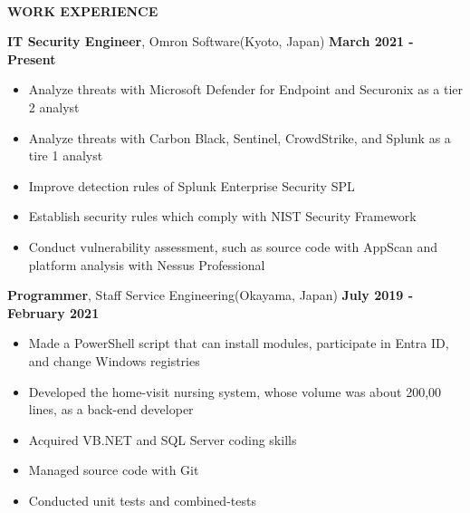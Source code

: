 \begin{center}
    \hrulefill \\
    \begin{large}
        \textbf{WORK EXPERIENCE} \\
    \end{large} 
\end{center}
\textbf{IT Security Engineer}, Omron Software(Kyoto, Japan) \hfill \textbf{March 2021 - Present}
\begin{itemize}
    \item Analyze threats with Microsoft Defender for Endpoint and Securonix as a tier 2 analyst
    \item Analyze threats with Carbon Black, Sentinel, CrowdStrike, and Splunk as a tire 1 analyst
    \item Improve detection rules of Splunk Enterprise Security SPL
    \item Establish security rules which comply with NIST Security Framework
    \item Conduct vulnerability assessment, such as source code with AppScan and platform analysis with Nessus Professional
\end{itemize}
\textbf{Programmer}, Staff Service Engineering(Okayama, Japan) \hfill \textbf{July 2019 - February 2021}
\begin{itemize}
    \item Made a PowerShell script that can install modules, participate in Entra ID, and change Windows registries
    \item Developed the home-visit nursing system, whose volume was about 200,00 lines, as a back-end developer
    \item Acquired VB.NET and SQL Server coding skills
    \item Managed source code with Git
    \item Conducted unit tests and combined-tests
\end{itemize}